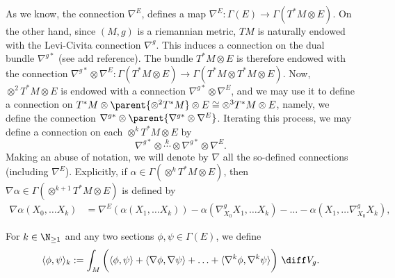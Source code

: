 As we know, the connection \(\nabla^E\), defines a map \(\nabla^E\colon \Gamma(E) \to \Gamma(T^*M \otimes E)\). On the other hand, since \((M,g)\) is a riemannian metric, \(TM\) is naturally endowed with the Levi-Civita connection \(\nabla^g\). This induces a connection on the dual bundle \(\nabla^{g*}\) (see {\color{red} add reference}). The bundle \(T^*M \otimes E\) is therefore endowed with the connection \(\nabla^{g*} \otimes \nabla^E \colon \Gamma(T^*M \otimes E) \to \Gamma(T^*M \otimes T^*M \otimes E)\). Now, \(\otimes^2 T^*M \otimes E\) is endowed with a connection \(\nabla^{g*} \otimes \nabla^E\), and we may use it to define a connection on \(T^*M \otimes \parent{\otimes^2 T^*M} \otimes E \cong\otimes^3 T^*M \otimes E\), namely, we define the connection \(\nabla^{g*} \otimes \parent{\nabla^{g*} \otimes \nabla^E}\). Iterating this process, we may define a connection on each \(\otimes^k T^*M\otimes E\) by 
\[
\nabla^{g*} \otimes \overset{k}{\cdots} \otimes \nabla^{g*} \otimes \nabla^E.
\]
Making an abuse of notation, we will denote by \(\nabla\) all the so-defined connections (including \(\nabla^E\)). Explicitly, if \(\alpha \in \Gamma(\otimes^k T^*M \otimes E)\), then \(\nabla \alpha \in \Gamma(\otimes^{k+1}T^*M \otimes E)\) is defined by
\begin{align*}
    \nabla \alpha(X_0, \ldots X_k)& =  \nabla^E(\alpha(X_1, \ldots X_k)) - \alpha(\nabla_{X_0}^g X_1, \ldots X_k) - \ldots - \alpha(X_1, \ldots \nabla_{X_0}^g X_k), 
\end{align*}

For \(k \in \N_{\geq 1}\) and any two sections \(\phi, \psi \in \Gamma(E)\), we define
\begin{equation} \label{prod_in_Gamma(E)}
\langle \phi, \psi\rangle_k:= \int_M \bigg( \langle \phi, \psi \rangle + \langle \nabla \phi, \nabla \psi \rangle  + \ldots+ \langle \nabla^k \phi, \nabla^k \psi \rangle \bigg) \ \diff V_g.
\end{equation}

